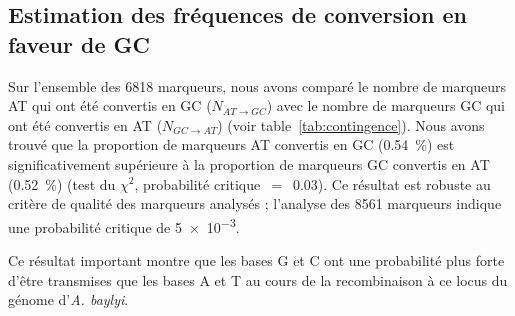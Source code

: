 \subsection{Estimation des fréquences de conversion en faveur de GC}
\label{subsec:result-freq}

Sur l'ensemble des \num{6818} marqueurs, nous avons comparé le nombre de
marqueurs AT qui ont été convertis en GC ($N_{AT \rightarrow GC}$) avec le
nombre de marqueurs GC qui ont été convertis en AT ($N_{GC \rightarrow AT}$)
(voir table~\ref{tab:contingence}). Nous avons trouvé que la proportion de
marqueurs AT convertis en GC (\SI{0.54}{\percent}) est significativement
supérieure à la proportion de marqueurs GC convertis en AT (\SI{.52}{\percent})
(test du $\chi^2$, probabilité critique~\(=\)~\num{0.03}). Ce résultat est
robuste au critère de qualité des marqueurs analysés ; l'analyse des \num{8561}
marqueurs indique une probabilité critique de \num{5e-3}.

Ce résultat important montre que les bases G et C ont une probabilité plus
forte d'être transmises que les bases A et T au cours de la recombinaison à ce
locus du génome d'\emph{A. baylyi}.

\newpage
